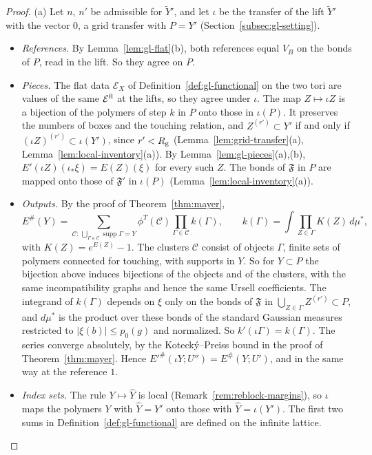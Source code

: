 \begin{proof}
(a) Let $n$, $n'$ be admissible for $\tilde Y'$, and let $\iota$ be the transfer of the lift $\tilde Y'$ with the vector $0$, a grid transfer with $P=Y'$ (Section~\ref{subsec:gl-setting}).
\begin{itemize}
\item \emph{References.} By Lemma~\ref{lem:gl-flat}(b), both references equal $V_B$ on the bonds of $P$, read in the lift. So they agree on $P$.
\item \emph{Pieces.} The flat data $\mathcal E_X$ of Definition~\ref{def:gl-functional} on the two tori are values of the same $\mathcal E^{\rm fl}$ at the lifts, so they agree under $\iota$. The map $Z\mapsto\iota Z$ is a bijection of the polymers of step $k$ in $P$ onto those in $\iota(P)$. It preserves the numbers of boxes and the touching relation, and $Z^{(r')}\subset Y'$ if and only if $(\iota Z)^{(r')}\subset\iota(Y')$, since $r'<R_{\rm g}$ (Lemma~\ref{lem:grid-transfer}(a), Lemma~\ref{lem:local-inventory}(a)). By Lemma~\ref{lem:gl-pieces}(a),(b), $E'(\iota Z)(\iota_*\xi)=E(Z)(\xi)$ for every such $Z$. The bonds of $\mathfrak F$ in $P$ are mapped onto those of $\mathfrak F'$ in $\iota(P)$ (Lemma~\ref{lem:local-inventory}(a)).
\item \emph{Outputs.} By the proof of Theorem~\ref{thm:mayer},
\[
E^\#(Y)=\sum_{\mathcal C:\,\bigcup_{\Gamma\in\mathcal C}\operatorname{supp}\Gamma=Y}\phi^T(\mathcal C)\prod_{\Gamma\in\mathcal C}k(\Gamma),\qquad k(\Gamma)=\int\prod_{Z\in\Gamma}K(Z)\,d\mu^*,
\]
with $K(Z)=e^{E(Z)}-1$. The clusters $\mathcal C$ consist of objects $\Gamma$, finite sets of polymers connected for touching, with supports in $Y$. So for $Y\subset P$ the bijection above induces bijections of the objects and of the clusters, with the same incompatibility graphs and hence the same Ursell coefficients. The integrand of $k(\Gamma)$ depends on $\xi$ only on the bonds of $\mathfrak F$ in $\bigcup_{Z\in\Gamma}Z^{(r')}\subset P$, and $d\mu^*$ is the product over these bonds of the standard Gaussian measures restricted to $|\xi(b)|\le p_0(g)$ and normalized. So $k'(\iota\Gamma)=k(\Gamma)$. The series converge absolutely, by the Koteck\'y--Preiss bound in the proof of Theorem~\ref{thm:mayer}. Hence $E'^\#(\iota Y;U'')=E^\#(Y;U')$, and in the same way at the reference $1$.
\item \emph{Index sets.} The rule $Y\mapsto\hat Y$ is local (Remark~\ref{rem:reblock-margins}), so $\iota$ maps the polymers $Y$ with $\hat Y=Y'$ onto those with $\hat Y=\iota(Y')$. The first two sums in Definition~\ref{def:gl-functional} are defined on the infinite lattice.
\end{itemize}


\end{proof}
